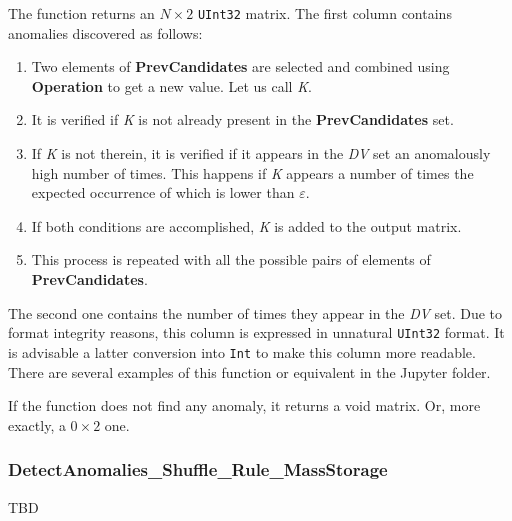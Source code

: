\begin{itemize}
\begin{itemize}
 		\end{itemize}
 		
 		The function returns an \(N\times 2\) \texttt{UInt32} matrix. The first column contains anomalies discovered as follows:
 		
 			 \begin{enumerate}
 			 	 \item Two elements of \textbf{PrevCandidates} are selected and combined using \textbf{Operation} to get a new value. Let us call \textit{K}.
 			 	 \item It is verified if \textit{K} is not already present in the \textbf{PrevCandidates} set.
 			 	 \item If \textit{K} is not therein, it is verified if it appears in the \textit{DV} set an anomalously high number of times. This happens if \textit{K} appears a number of times the expected occurrence of which is lower than \textbf{\(\varepsilon\)}.
 			 	 \item If both conditions are accomplished, \textit{K} is added to the output matrix.
 			 	 \item This process is repeated with all the possible pairs of elements of \textbf{PrevCandidates}.
 			 \end{enumerate}
 		 
 		The second one contains the number of times they appear in the \textit{DV} set. Due to format integrity reasons, this column is expressed in unnatural \texttt{UInt32} format. It is advisable a latter conversion into \texttt{Int} to make this column more readable. There are several examples of this function or equivalent in the Jupyter folder.
 		
 		If the function does not find any anomaly, it returns a void matrix.  Or, more exactly, a \(0\times 2\) one.
 		
 \end{itemize}
 \subsubsection*{DetectAnomalies\_Shuffle\_Rule\_MassStorage}\label{Fun:DetectAnomaliesShuffleRule_MassStorage}
 TBD
